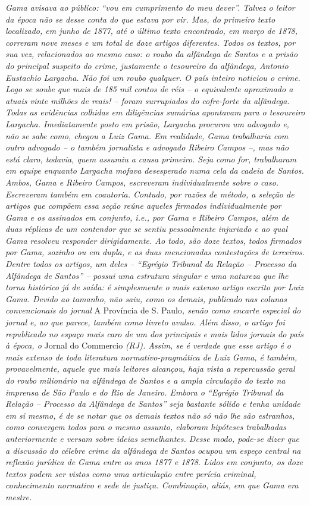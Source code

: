 \emph{Gama avisava ao público: ``vou em cumprimento do meu dever''.
Talvez o leitor da época não se desse conta do que estava por vir. Mas,
do primeiro texto localizado, em junho de 1877, até o último texto
encontrado, em março de 1878, correram nove meses e um total de doze
artigos diferentes. Todos os textos, por sua vez, relacionados ao mesmo
caso: o roubo da alfândega de Santos e a prisão do principal suspeito do
crime, justamente o tesoureiro da alfândega, Antonio Eustachio Largacha.
Não foi um roubo qualquer. O país inteiro noticiou o crime. Logo se
soube que mais de 185 mil contos de réis -- o equivalente aproximado a
atuais vinte milhões de reais! -- foram surrupiados do cofre-forte da
alfândega. Todas as evidências colhidas em diligências sumárias
apontavam para o tesoureiro Largacha. Imediatamente posto em prisão,
Largacha procurou um advogado e, não se sabe como, chegou a Luiz Gama.
Em realidade, Gama trabalharia com outro advogado -- o também jornalista
e advogado Ribeiro Campos --, mas não está claro, todavia, quem assumiu
a causa primeiro. Seja como for, trabalharam em equipe enquanto Largacha
mofava desesperado numa cela da cadeia de Santos. Ambos, Gama e Ribeiro
Campos, escreveram individualmente sobre o caso. Escreveram também em
coautoria. Contudo, por razões de método, a seleção de artigos que
compõem essa seção reúne aqueles firmados individualmente por Gama e os
assinados em conjunto, i.e., por Gama e Ribeiro Campos, além de duas
réplicas de um contendor que se sentiu pessoalmente injuriado e ao qual
Gama resolveu responder dirigidamente. Ao todo, são doze textos, todos
firmados por Gama, sozinho ou em dupla, e as duas mencionadas
contestações de terceiros. Dentre todos os artigos, um deles --
``\emph{Egrégio Tribunal da Relação -- Processo da Alfândega de
Santos}'' -- possui uma estrutura singular e uma natureza que lhe torna
histórico já de saída: é simplesmente o mais extenso artigo escrito por
Luiz Gama. Devido ao tamanho, não saiu, como os demais, publicado nas
colunas convencionais do jornal} A Província de S. Paulo\emph{, senão
como encarte especial do jornal e, ao que parece, também como livreto
avulso. Além disso, o artigo foi republicado no espaço mais caro de um
dos principais e mais lidos jornais do país à época, o} Jornal do
Commercio \emph{(RJ). Assim, se é verdade que esse artigo é o mais
extenso de toda literatura normativo-pragmática de Luiz Gama, é também,
provavelmente, aquele que mais leitores alcançou, haja vista a
repercussão geral do roubo milionário na alfândega de Santos e a ampla
circulação do texto na imprensa de São Paulo e do Rio de Janeiro. Embora
o ``\emph{Egrégio Tribunal da Relação -- Processo da Alfândega de
Santos}'' seja bastante sólido e tenha unidade em si mesmo, é de se
notar que os demais textos não só não lhe são estranhos, como convergem
todos para o mesmo assunto, elaboram hipóteses trabalhadas anteriormente
e versam sobre ideias semelhantes. Desse modo, pode-se dizer que a
discussão do célebre crime da alfândega de Santos ocupou um espeço
central na reflexão jurídica de Gama entre os anos 1877 e 1878. Lidos em
conjunto, os doze textos podem ser vistos como uma articulação entre
perícia criminal, conhecimento normativo e sede de justiça. Combinação,
aliás, em que Gama era mestre.}

